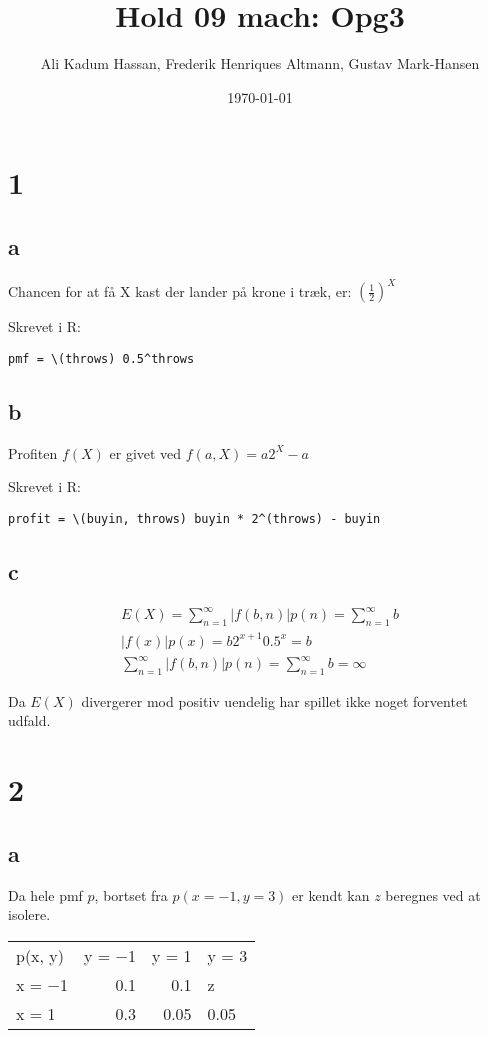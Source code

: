 \documentclass[11pt]{article}
\author{Ali Kadum Hassan, Frederik Henriques Altmann, Gustav Mark-Hansen}
\date{\today}
\title{Hold 09 mach: Opg3}
\begin{document}
\maketitle

\section*{1}
\label{sec:org05bc15b}

\subsection*{a}
\label{sec:orgd8c1f92}
Chancen for at få X kast der lander på krone i træk, er:
\((\frac{1}{2})^X\)

Skrevet i R:
\begin{verbatim}
pmf = \(throws) 0.5^throws
\end{verbatim}
\subsection*{b}
\label{sec:orgc62789a}
Profiten \(f(X)\) er givet ved \(f(a, X) = a2^X - a\)

Skrevet i R:
\begin{verbatim}
profit = \(buyin, throws) buyin * 2^(throws) - buyin
\end{verbatim}
\subsection*{c}
\label{sec:org6689ae5}
\begin{align}
E(X) = \sum_{n=1}^\infty |f(b,n)|p(n) = \sum_{n=1}^\infty b \\
|f(x)|p(x) = b2^{x+1}0.5^x = b \\
\sum_{n=1}^\infty |f(b,n)|p(n) = \sum_{n=1}^\infty b = \infty
\end{align}

Da \(E(X)\) divergerer mod positiv uendelig har spillet ikke noget forventet udfald.
\section*{2}
\label{sec:org2284d3a}
\subsection*{a}
\label{sec:orgf15ed8c}
Da hele pmf \(p\), bortset fra \(p(x=-1,y=3)\) er kendt kan \(z\) beregnes ved at isolere.

\begin{center}
\begin{tabular}{lrrl}
p(x, y) & y = −1 & y = 1 & y = 3\\
x = −1 & 0.1 & 0.1 & z\\
x = 1 & 0.3 & 0.05 & 0.05\\
\end{tabular}
\end{center}
\end{document}
